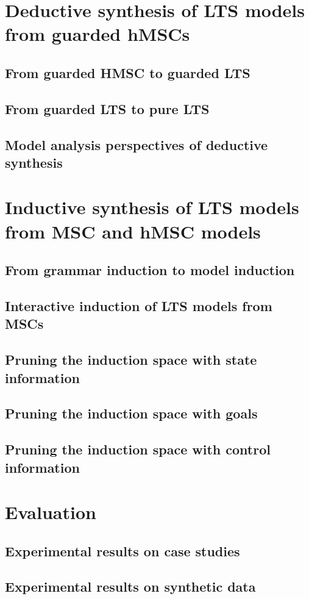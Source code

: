 \documentclass[dvips,a4paper,11pt]{report}
\begin{document}
\chapter{Deductive synthesis of LTS models from guarded hMSCs}
  \section{From guarded HMSC to guarded LTS}
  \section{From guarded LTS to pure LTS}
  \section{Model analysis perspectives of deductive synthesis}
\chapter{Inductive synthesis of LTS models from MSC and hMSC models\label{chapter:inductive-synthesis}}
  \section{From grammar induction to model induction}
  \section{Interactive induction of LTS models from MSCs}
  \section{Pruning the induction space with state information}
  \section{Pruning the induction space with goals}
  \section{Pruning the induction space with control information}
\chapter{Evaluation}
  \section{Experimental results on case studies}
  \section{Experimental results on synthetic data}
\end{document}
